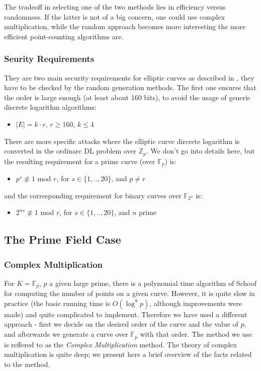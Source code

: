 \documentclass[11pt,english]{article}
\begin{document}
The tradeoff in selecting one of the two methods lies in efficiency versus randomness. If the latter is not of a big concern, one could use complex multiplication, while the random approach becomes more interesting the more efficient point-counting algorithms are.

\subsubsection{Seurity Requirements}
They are two main security requirements for elliptic curves as described in \cite{buchmann}, they have to be checked by the random generation methods. The first one ensures that the order is large enough (at least about 160 bits), to avoid the usage of generic discrete logarithm algorithms:
\begin{itemize}
 \item $|E|=k\cdot r$, $r\geq 160$, $k\leq 4$
\end{itemize}
There are more specific attacks where the elliptic curve dircrete logarithm is converted in the ordinarc DL problem over $\mathbb{Z}_p$. We don't go into details here, but the resulting requirement for a prime curve (over $\mathbb{F}_p$) is:
\begin{itemize}
 \item $p^s\not\equiv 1$ mod $r$, for $s\in\{1,..,20\}$, and $p\neq r$
\end{itemize}
and the corresponding requirement for binary curves over $\mathbb{F}_{2^n}$ is:
\begin{itemize}
 \item $2^{ns}\not\equiv 1$ mod $r$, for $s\in\{1,..,20\}$, and $n$ prime
\end{itemize}


\subsection{The Prime Field Case}
\subsubsection{Complex Multiplication}
For $K=\mathbb{F}_p$, $p$ a given large prime, there is a polynomial time algorithm of Schoof for computing the number of points on a given curve.
However, it is quite slow in practice (the basic running time is $O(\log ^8p)$, although improvements were made) and quite complicated to implement.
Therefore we have used a different approach - first we decide on the desired order of the curve and the value of $p$, and afterwards we generate a
curve over $\mathbb{F}_p$ with that order. The method we use is reffered to as the \emph{Complex Multiplication} method. The theory of complex
multiplication is quite deep; we present here a brief overview of the facts related to the method.
\end{document}
